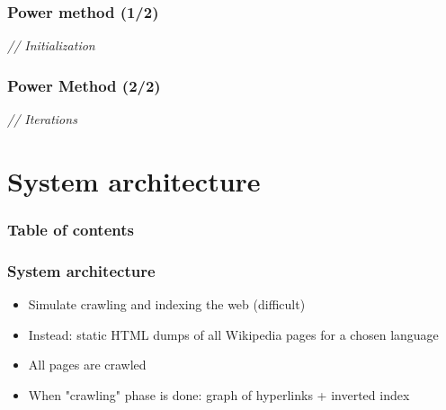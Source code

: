 \documentclass[10pt]{beamer}
\begin{document}
\begin{frame}
  \frametitle{Power method (1/2)}
  \IncMargin{1em}
  \begin{algorithm}[H]
    \BlankLine
    \Indm
    \Indp
    \BlankLine
    \emph{// Initialization}\;
  \end{algorithm}
  \DecMargin{1em}
\end{frame}

\begin{frame}
  \frametitle{Power Method (2/2)}
  \IncMargin{1em}
  \begin{algorithm}[H]
    \emph{// Iterations}\;
    \BlankLine
  \end{algorithm}
  \DecMargin{1em}
\end{frame}



\section{System architecture}

\begin{frame}
  \frametitle{Table of contents}
  \tableofcontents[currentsection]
\end{frame}

\begin{frame}
  \frametitle{System architecture}
  \begin{itemize}
    \item Simulate crawling and indexing the web (difficult)
    \item Instead: static HTML dumps of all Wikipedia pages for a chosen language
    \item All pages are crawled
    \item When "crawling" phase is done: graph of hyperlinks + inverted index
  \end{itemize}
\end{frame}
\end{document}
